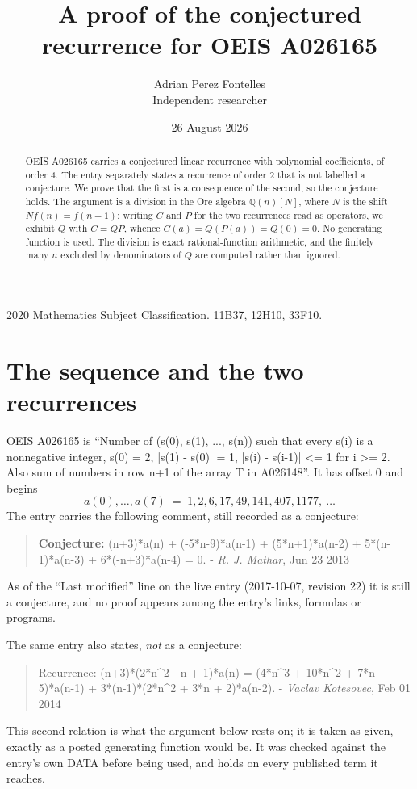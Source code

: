 \documentclass[11pt,a4paper]{article}
\title{A proof of the conjectured recurrence for OEIS A026165}
\author{Adrian Perez Fontelles\\ \small Independent researcher}
\date{26 August 2026}
\theoremstyle{plain}
\theoremstyle{definition}
\begin{document}
\maketitle

\begin{abstract}
OEIS A026165 carries a conjectured linear recurrence with polynomial coefficients, of
order 4. The entry separately states a recurrence of order 2 that is not
labelled a conjecture. We prove that the first is a consequence of the second, so the
conjecture holds. The argument is a division in the Ore algebra
$\mathbb{Q}(n)[N]$, where $N$ is the shift $Nf(n)=f(n+1)$: writing $C$ and $P$ for the two
recurrences read as operators, we exhibit $Q$ with $C=QP$, whence
$C(a)=Q(P(a))=Q(0)=0$. No generating function is used. The division is exact
rational-function arithmetic, and the finitely many $n$ excluded by denominators of $Q$
are computed rather than ignored.
\end{abstract}

\noindent\small 2020 Mathematics Subject Classification. 11B37, 12H10, 33F10.\normalsize

\section{The sequence and the two recurrences}

OEIS A026165 is ``Number of (s(0), s(1), ..., s(n)) such that every s(i) is a nonnegative integer, s(0) = 2, |s(1) - s(0)| = 1, |s(i) - s(i-1)| <= 1 for i >= 2. Also sum of numbers in row n+1 of the array T in A026148''. It has offset $0$ and begins
\[
a(0),\dots,a(7)\;=\;1, 2, 6, 17, 49, 141, 407, 1177,\ \dots
\]
The entry carries the following comment, still recorded as a conjecture:
\begin{quote}\small
\textbf{Conjecture:} (n+3)*a(n) + (-5*n-9)*a(n-1) + (5*n+1)*a(n-2) + 5*(n-1)*a(n-3) + 6*(-n+3)*a(n-4) = 0. - \emph{R. J. Mathar}, Jun 23 2013
\end{quote}
As of the ``Last modified'' line on the live entry (2017-10-07, revision 22) it is still
a conjecture, and no proof appears among the entry's links, formulas or programs.

The same entry also states, \emph{not} as a conjecture:
\begin{quote}\small
Recurrence: (n+3)*(2*n\^{}2 - n + 1)*a(n) = (4*n\^{}3 + 10*n\^{}2 + 7*n - 5)*a(n-1) + 3*(n-1)*(2*n\^{}2 + 3*n + 2)*a(n-2). - \emph{Vaclav Kotesovec}, Feb 01 2014
\end{quote}
This second relation is what the argument below rests on; it is taken as given, exactly as
a posted generating function would be. It was checked against the entry's own DATA before
being used, and holds on every published term it reaches.
\end{document}
